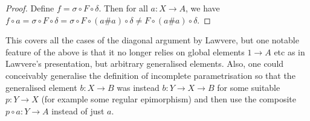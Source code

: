 \documentclass{tufte-handout}
\theoremstyle{definition}
\begin{document}
\begin{proof}
  Define $f = \sigma\circ F\circ \delta$. 
  Then for all $a\colon X\to A$, we have $f\circ a = \sigma \circ F\circ \delta = \sigma \circ F \circ (a\#a)\circ \delta \not=F\circ (a\#a)\circ \delta$.
\end{proof}

\noindent
This covers all the cases of the diagonal argument by Lawvere, but  one notable feature of the above is that it no longer relies on global elements $1\to A$ etc as in Lawvere's presentation, but arbitrary generalised elements.
Also, one could conceivably generalise the definition of incomplete parametrisation so that the generalised element $b\colon X\to B$ was instead $b\colon Y\to X \to B$ for some suitable $p\colon Y\to X$ (for example some regular epimorphism) and then use the composite $p\circ a\colon Y\to A$ instead of just $a$.
\end{document}
